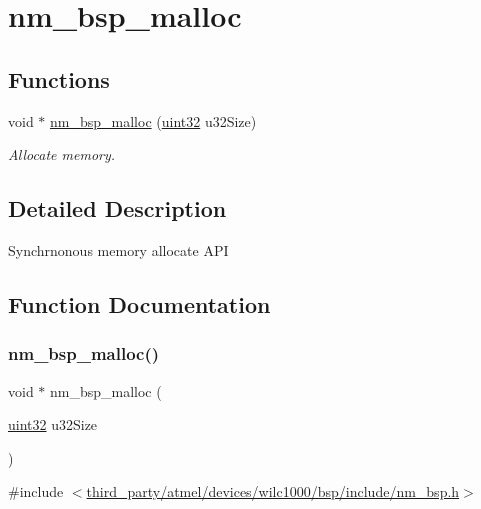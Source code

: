 \hypertarget{group__NmBspMalloc}{}\section{nm\+\_\+bsp\+\_\+malloc}
\label{group__NmBspMalloc}
\subsection*{Functions}
\begin{DoxyCompactItemize}
\item 
void $\ast$ \hyperlink{group__NmBspMalloc_ga403a19b4fbf455a05ca69b22ce1de311}{nm\+\_\+bsp\+\_\+malloc} (\hyperlink{group__DataT_ga100e7c691a47d6978527c479a0158245}{uint32} u32\+Size)
\begin{DoxyCompactList}\small\item\em Allocate memory. \end{DoxyCompactList}\end{DoxyCompactItemize}


\subsection{Detailed Description}
Synchrnonous memory allocate A\+PI 

\subsection{Function Documentation}
\mbox{\label{group__NmBspMalloc_ga403a19b4fbf455a05ca69b22ce1de311}} 
\subsubsection{\texorpdfstring{nm\+\_\+bsp\+\_\+malloc()}{nm\_bsp\_malloc()}}
{\footnotesize\ttfamily void $\ast$ nm\+\_\+bsp\+\_\+malloc (\begin{DoxyParamCaption}\item[{\hyperlink{group__DataT_ga100e7c691a47d6978527c479a0158245}{uint32}}]{u32\+Size }\end{DoxyParamCaption})}



{\ttfamily \#include $<$\hyperlink{nm__bsp_8h}{third\+\_\+party/atmel/devices/wilc1000/bsp/include/nm\+\_\+bsp.\+h}$>$}




